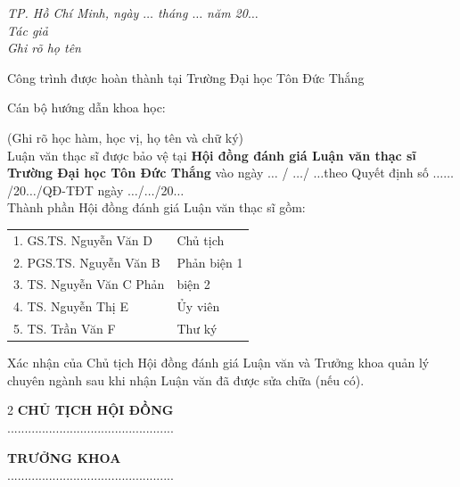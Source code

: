 \documentclass[12pt,a4paper]{report}
\numberwithin{figure}{chapter}
\numberwithin{table}{chapter}
\begin{document}
	\vspace*{1cm}
	\begin{flushright}
		\begin{minipage}{8.75cm}
			\centering\itshape
			TP. Hồ Chí Minh, ngày $\ldots$ tháng $\ldots$ năm 20$\ldots$\\
			Tác giả\\[3cm]
			Ghi rõ họ tên
		\end{minipage}
	\end{flushright}
	
	\newpage
	Công trình được hoàn thành tại Trường Đại học Tôn Đức Thắng
	
	Cán bộ hướng dẫn khoa học: \dotfill
	
	\hspace*{5.3cm}\dotfill
	
	\hspace*{6.5cm}(Ghi rõ học hàm, học vị, họ tên và chữ ký)\\[0.25cm]
	
	Luận văn thạc sĩ được bảo vệ tại \textbf{Hội đồng đánh giá Luận văn thạc sĩ Trường Đại học Tôn Đức Thắng} vào ngày $\ldots$ / $\ldots$/ $\ldots$theo Quyết định số $\ldots\ldots$/20$\ldots$/QĐ-TĐT ngày
	$\ldots$/$\ldots$/20$\ldots$\\
	
	Thành phần Hội đồng đánh giá Luận văn thạc sĩ gồm:
	
	\begin{tabular}{p{9cm}l}
		1. GS.TS. Nguyễn Văn D& Chủ tịch\\
		2. PGS.TS. Nguyễn Văn B& Phản biện 1\\
		3. TS. Nguyễn Văn C Phản& biện 2\\
		4. TS. Nguyễn Thị E& Ủy viên\\
		5. TS. Trần Văn F& Thư ký\\
	\end{tabular}
	\vspace*{1cm}
	
	Xác nhận của Chủ tịch Hội đồng đánh giá Luận văn và Trưởng khoa quản lý chuyên ngành sau khi nhận Luận văn đã được sửa chữa (nếu có).
	\vspace*{1cm}
	\begin{multicols}{2}
		\centering
		\textbf{CHỦ TỊCH HỘI ĐỒNG}\\[3cm]
		................................................
		
		\textbf{TRƯỞNG KHOA}\\[3cm]
		................................................
	\end{multicols}
	
\end{document}
